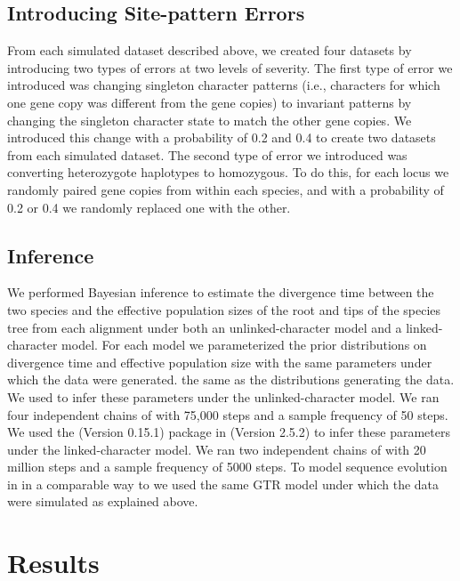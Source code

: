 \subsection{Introducing Site-pattern Errors}
From each simulated dataset described above, we created four datasets by 
introducing two types of errors at two levels of severity. The first type of 
error we introduced was changing singleton character patterns (i.e., characters 
for which one gene copy was different from the gene copies) to invariant 
patterns by changing the singleton character state to match the other gene 
copies. We introduced this change with a probability of 0.2 and 0.4 to create 
two datasets from each simulated dataset. The second type of error we introduced 
was converting heterozygote haplotypes to homozygous. To do this, for each locus 
we randomly paired gene copies from within each species, and with a probability 
of 0.2 or 0.4 we randomly replaced one with the other. 

\subsection{Inference}
We performed Bayesian inference to estimate the divergence time between the two species and the effective 
population sizes of the root and tips of the species tree from each alignment 
under both an unlinked-character model and a linked-character model. For each 
model we parameterized the prior distributions on divergence time and effective
population size with the same parameters under which the data were generated. 
the same as the distributions generating the data.
We used \ecoevolity
\citep[Version 0.3.2; dev branch commit a7e9bf2;][]{Oaks2018ecoevolity}
to infer these parameters under the 
unlinked-character model.
We ran four independent chains of \ecoevolity with 75,000 steps and a sample 
frequency of 50 steps.
We used the \beast (Version 0.15.1) \citep{@ogilvieStarBEAST2BringsFaster2017} 
package in \beastcore (Version 2.5.2) \citep{@bouckaertBEASTSoftwarePlatform2014}
to infer these parameters under the linked-character model. 
We ran two independent chains of \beast with 20 million steps and a 
sample frequency of 5000 steps. 
To model sequence evolution in \beast in a comparable way to \ecoevolity we used 
the same GTR model under which the data were simulated as explained above.


\section{Results}


